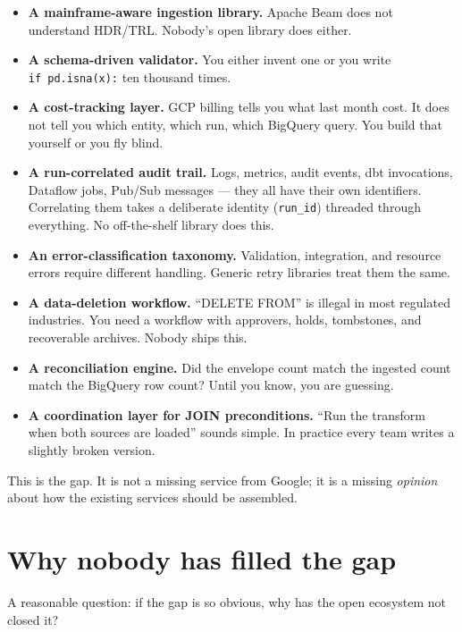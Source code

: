 \documentclass[
  11pt,
  british,
  oneside]{book}
\providecommand{\tightlist}{%
  \setlength{\itemsep}{0pt}\setlength{\parskip}{0pt}}
\begin{document}
\begin{itemize}
\tightlist
\item
  \textbf{A mainframe-aware ingestion library.} Apache Beam does not
  understand HDR/TRL. Nobody's open library does either.
\item
  \textbf{A schema-driven validator.} You either invent one or you write
  \texttt{if\ pd.isna(x):} ten thousand times.
\item
  \textbf{A cost-tracking layer.} GCP billing tells you what last month
  cost. It does not tell you which entity, which run, which BigQuery
  query. You build that yourself or you fly blind.
\item
  \textbf{A run-correlated audit trail.} Logs, metrics, audit events,
  dbt invocations, Dataflow jobs, Pub/Sub messages --- they all have
  their own identifiers. Correlating them takes a deliberate identity
  (\texttt{run\_id}) threaded through everything. No off-the-shelf
  library does this.
\item
  \textbf{An error-classification taxonomy.} Validation, integration,
  and resource errors require different handling. Generic retry
  libraries treat them the same.
\item
  \textbf{A data-deletion workflow.} ``DELETE FROM'' is illegal in most
  regulated industries. You need a workflow with approvers, holds,
  tombstones, and recoverable archives. Nobody ships this.
\item
  \textbf{A reconciliation engine.} Did the envelope count match the
  ingested count match the BigQuery row count? Until you know, you are
  guessing.
\item
  \textbf{A coordination layer for JOIN preconditions.} ``Run the
  transform when both sources are loaded'' sounds simple. In practice
  every team writes a slightly broken version.
\end{itemize}

This is the gap. It is not a missing service from Google; it is a
missing \emph{opinion} about how the existing services should be
assembled.

\hypertarget{why-nobody-has-filled-the-gap}{%
\section{Why nobody has filled the
gap}\label{why-nobody-has-filled-the-gap}}

A reasonable question: if the gap is so obvious, why has the open
ecosystem not closed it?
\end{document}
